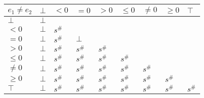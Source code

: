 \documentclass{article}
\begin{document}
\begin{table}
    \begin{tabular}{|l|l|l|l|l|l|l|l|l|}
    \hline
    $e_1 \ne e_2$ & $\bot$ & $<0$   & $=0$   & $>0$   & $\le 0$ & $\ne 0$ & $\ge 0$ & $\top$ \\ \hline
    $\bot$        & $\bot$ &        &        &        &         &         &         &        \\ \hline
    $<0$          & $\bot$ & $s^\#$ &        &        &         &         &         &        \\ \hline
    $=0$          & $\bot$ & $s^\#$ & $\bot$ &        &         &         &         &        \\ \hline
    $>0$          & $\bot$ & $s^\#$ & $s^\#$ & $s^\#$ &         &         &         &        \\ \hline
    $\le 0$       & $\bot$ & $s^\#$ & $s^\#$ & $s^\#$ & $s^\#$  &         &         &        \\ \hline
    $\ne 0$       & $\bot$ & $s^\#$ & $s^\#$ & $s^\#$ & $s^\#$  & $s^\#$  &         &        \\ \hline
    $\ge 0$       & $\bot$ & $s^\#$ & $s^\#$ & $s^\#$ & $s^\#$  & $s^\#$  & $s^\#$  &        \\ \hline
    $\top$        & $\bot$ & $s^\#$ & $s^\#$ & $s^\#$ & $s^\#$  & $s^\#$  & $s^\#$  & $s^\#$ \\ \hline
    \end{tabular}
    \end{table}
\end{document}

